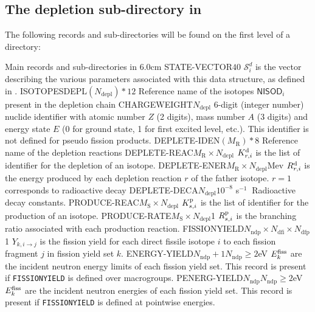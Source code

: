 \subsection{The depletion sub-directory  in
}\label{sect:microlibdirdepletion}

The following records and sub-directories will be found on the first level of a
 directory:

\begin{DescriptionEnregistrement}{Main records and sub-directories in
}{6.0cm}
\label{tabl:tabchain}
\IntEnr
  {STATE-VECTOR}{$40$}
  {$\mathcal{S}^{d}_{i}$ is the vector describing the various parameters associated with this data structure,
  as defined in .}
\CharEnr
  {ISOTOPESDEPL}{$(N_{\mathrm{depl}})*12$}
  {Reference name of the isotopes $\mathsf{NISOD}_{i}$ present in the depletion chain}
\IntEnr
  {CHARGEWEIGHT}{$N_{\mathrm{depl}}$}
  {6-digit (integer number) nuclide identifier with atomic number $Z$ (2
  digits), mass number $A$ (3 digits) and energy state $E$ (0 for ground state, 1
  for first excited level, etc.). This identifier is not defined for pseudo
  fission products.}
\CharEnr
  {DEPLETE-IDEN}{$(M_{\mathrm{R}})*8$}
  {Reference name of the depletion reactions}
\IntEnr
  {DEPLETE-REAC}{$M_{\mathrm{R}}\times N_{\mathrm{depl}}$}
  {$K_{r,i}^{\rm d}$ is the list of identifier for the depletion of an isotope.}
\RealEnr
  {DEPLETE-ENER}{$M_{\mathrm{R}}\times N_{\mathrm{depl}}$}{Mev}
  {$R_{r,i}^{\rm d}$ is the energy produced by each depletion reaction $r$ of the father isotope. $r=1$ corresponds to radioactive decay}
\RealEnr
  {DEPLETE-DECA}{$N_{\mathrm{depl}}$}{$10^{-8}$ s$^{-1}\ $}
  {Radioactive decay constants.}
\IntEnr
  {PRODUCE-REAC}{$M_{\mathrm{S}}\times N_{\mathrm{depl}}$}
  {$K_{s,i}^{\rm p}$ is the list of identifier for the production of an isotope.}
\RealEnr
  {PRODUCE-RATE}{$M_{\mathrm{S}}\times N_{\mathrm{depl}}$}{1}
  {$R_{s,i}^{\rm p}$ is the branching ratio associated with each production reaction.}
\RealEnr
  {FISSIONYIELD}{$N_{\mathrm{ndp}} \times N_{\mathrm{dfi}}\times N_{\mathrm{dfp}}$}{1}
  {$Y_{k,{i\to j}}$ is the fission yield for each direct fissile isotope $i$ to each fission fragment $j$ in fission yield
  set $k$.}
\OptRealEnr
  {ENERGY-YIELD}{$N_{\mathrm{ndp}}+1$}{$N_\mathrm{ndp}\ge 2$}{eV}
  {$E_{k}^{\rm fiss}$ are the incident neutron energy limits of each fission yield set. This record is present if {\tt FISSIONYIELD} is defined over macrogroups.}
\OptRealEnr
  {PENERG-YIELD}{$N_{\mathrm{ndp}}$}{$N_\mathrm{ndp}\ge 2$}{eV}
  {$E_{k}^{\rm fiss}$ are the incident neutron energies of each fission yield set. This record is present if {\tt FISSIONYIELD} is defined at pointwise energies.}
\end{DescriptionEnregistrement}

